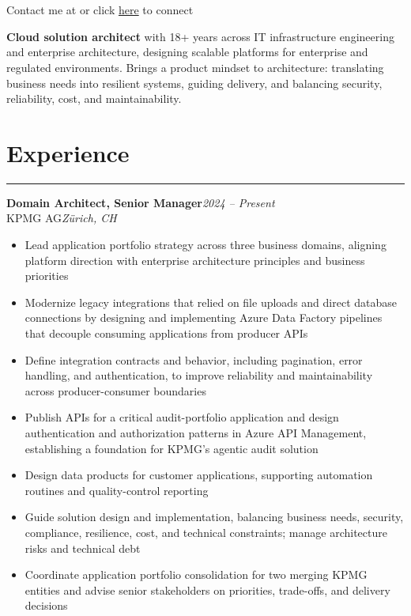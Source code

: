 \documentclass[10pt,a4paper]{article}
\newcommand{\jobseparator}{\vspace{0.45em}}
\newcommand{\contactheader}{
  \begin{center}
    {\fontsize{24}{28}\selectfont\bfseries \personNameUpper\\[0.35em]}
    {\large
      \faPhone\ \personPhone\ \hspace{0.5em} \textbullet\ \hspace{0.5em} \personAddress\\
      Contact me at \href{mailto:\personEmail}{\personEmail} or click \href{\personLinkedIn}{here} to connect
      \href{\personLinkedIn}{\faLinkedin}
    }
  \end{center}
  \vspace{0.2em}
}
\newcommand{\sectionrule}{\noindent\rule{\linewidth}{0.4pt}\par\vspace{0.24em}}
\newcommand{\job}[6]{%
  {\textbf{#1}}\hfill{\textit{#2}}\\
  {#3}\hfill{\textit{#4}}\\
  \begin{itemize}
    #5
  \end{itemize}
}
\begin{document}
\contactheader

\noindent\textbf{Cloud solution architect} with 18+ years across IT infrastructure engineering and enterprise architecture, designing scalable platforms for enterprise and regulated environments. Brings a product mindset to architecture: translating business needs into resilient systems, guiding delivery, and balancing security, reliability, cost, and maintainability.

\section*{Experience}
\sectionrule

\job{Domain Architect, Senior Manager}{2024 -- Present}{KPMG AG}{Zürich, CH}{
  \item Lead application portfolio strategy across three business domains, aligning platform direction with enterprise architecture principles and business priorities
  \item Modernize legacy integrations that relied on file uploads and direct database connections by designing and implementing Azure Data Factory pipelines that decouple consuming applications from producer APIs
  \item Define integration contracts and behavior, including pagination, error handling, and authentication, to improve reliability and maintainability across producer-consumer boundaries
  \item Publish APIs for a critical audit-portfolio application and design authentication and authorization patterns in Azure API Management, establishing a foundation for KPMG's agentic audit solution
  \item Design data products for customer applications, supporting automation routines and quality-control reporting
  \item Guide solution design and implementation, balancing business needs, security, compliance, resilience, cost, and technical constraints; manage architecture risks and technical debt
  \item Coordinate application portfolio consolidation for two merging KPMG entities and advise senior stakeholders on priorities, trade-offs, and delivery decisions
}{ }
\jobseparator
\end{document}
